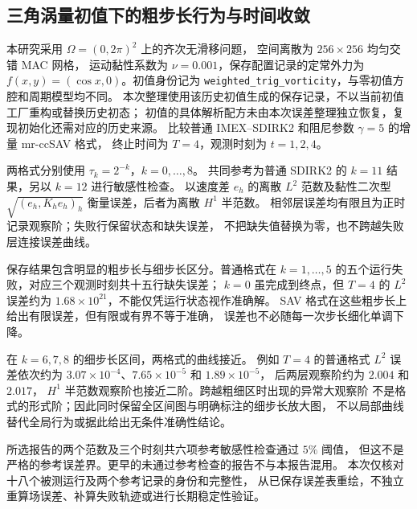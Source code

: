 \subsection{三角涡量初值下的粗步长行为与时间收敛}

本研究采用 $\Omega=(0,2\pi)^2$ 上的齐次无滑移问题，
空间离散为 $256\times256$ 均匀交错 MAC 网格，
运动黏性系数为 $\nu=0.001$，保存配置记录的定常外力为
$f(x,y)=(\cos x,0)$。初值身份记为
\texttt{weighted\_trig\_vorticity}，与零初值方腔和周期模型均不同。
本次整理使用该历史初值生成的保存记录，不以当前初值工厂重构或替换历史初态；
初值的具体解析配方未由本次误差整理独立恢复，复现初始化还需对应的历史来源。
比较普通 IMEX--SDIRK2 和阻尼参数 $\gamma=5$ 的增量 mr-ccSAV 格式，
终止时间为 $T=4$，观测时刻为 $t=1,2,4$。

两格式分别使用 $\tau_k=2^{-k}$，$k=0,\ldots,8$。
共同参考为普通 SDIRK2 的 $k=11$ 结果，另以 $k=12$ 进行敏感性检查。
以速度差 $e_h$ 的离散 $L^2$ 范数及黏性二次型
$\sqrt{(e_h,K_he_h)_h}$ 衡量误差，后者为离散 $H^1$ 半范数。
相邻层误差均有限且为正时记录观察阶；失败行保留状态和缺失误差，
不把缺失值替换为零，也不跨越失败层连接误差曲线。

保存结果包含明显的粗步长与细步长区分。普通格式在 $k=1,\ldots,5$
的五个运行失败，对应三个观测时刻共十五行缺失误差；
$k=0$ 虽完成到终点，但 $T=4$ 的 $L^2$ 误差约为
$1.68\times10^{21}$，不能仅凭运行状态视作准确解。
SAV 格式在这些粗步长上给出有限误差，但有限或有界不等于准确，
误差也不必随每一次步长细化单调下降。

在 $k=6,7,8$ 的细步长区间，两格式的曲线接近。
例如 $T=4$ 的普通格式 $L^2$ 误差依次约为
$3.07\times10^{-4}$、$7.65\times10^{-5}$ 和 $1.89\times10^{-5}$，
后两层观察阶约为 $2.004$ 和 $2.017$，
$H^1$ 半范数观察阶也接近二阶。跨越粗细区时出现的异常大观察阶
不是格式的形式阶；因此同时保留全区间图与明确标注的细步长放大图，
不以局部曲线替代全局行为或据此给出无条件准确性结论。

所选报告的两个范数及三个时刻共六项参考敏感性检查通过 $5\%$ 阈值，
但这不是严格的参考误差界。更早的未通过参考检查的报告不与本报告混用。
本次仅核对十八个被测运行及两个参考记录的身份和完整性，
从已保存误差表重绘，不独立重算场误差、补算失败轨迹或进行长期稳定性验证。
